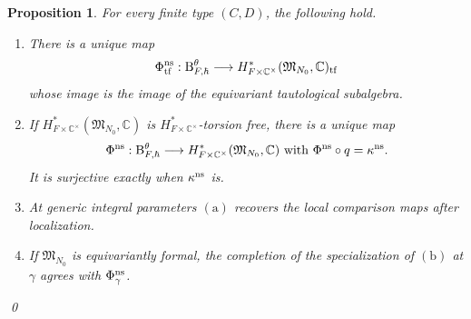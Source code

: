 \documentclass[11pt,reqno]{amsart}
\newtheorem{Proposition}[Theorem]{Proposition}
\theoremstyle{definition}
\theoremstyle{remark}
\def\bbC{\mathbb C}
\def\B{\mathrm B}
\begin{document}
\begin{Proposition}\label{prop:ns-global-torsion}
For every finite type $(C,D)$, the following hold.
\begin{enumerate}[label=$\mathrm{(\alph*)}$,leftmargin=8mm,itemsep=2mm]
\item There is a unique map
\[
 \Phi^{\rm ns}_{\rm tf}:\B^\theta_{F,\hbar}\longrightarrow H^*_{F\times\bbC^\times}(\mathfrak M_{N_0},\bbC)_{\rm tf}
\]
whose image is the image of the equivariant tautological subalgebra.
\item If $H^*_{F\times\bbC^\times}(\mathfrak M_{N_0},\bbC)$ is ${H^*_{F\times\bbC^\times}}$-torsion free, there is a unique map
\[
 \Phi^{\rm ns}:\B^\theta_{F,\hbar}\longrightarrow H^*_{F\times\bbC^\times}(\mathfrak M_{N_0},\bbC)
 \text{ with }
 \Phi^{\rm ns}\circ q=\kappa^{\rm ns}.
\]
It is surjective exactly when $\kappa^{\rm ns}$ is.
\item At generic integral parameters $\mathrm{(a)}$ recovers the local comparison
maps after localization. 

\item
If $\mathfrak M_{N_0}$ is equivariantly formal,
the completion of the specialization of $\mathrm{(b)}$ at $\gamma$
agrees with $\Phi^{\rm ns}_\gamma$.
\end{enumerate}
\qed
\end{Proposition}

%
\end{document}
